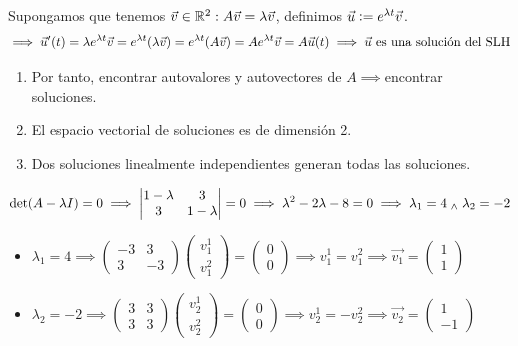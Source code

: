 Supongamos que tenemos $\vec{v} \in \mathbb{R}^2 : A\vec{v} = \lambda \vec{v}$, definimos $\vec{u} \vcentcolon= e^{\lambda t} \vec{v}$.
\[\implies \vec{u}'(t) = \lambda e^{\lambda t} \vec{v} = e^{\lambda t} (\lambda \vec{v}) = e^{\lambda t} (A \vec{v}) = A e^{\lambda t} \vec{v} = A \vec{u}(t) \implies \vec{u} \text{ es una solución del SLH}\]
\begin{enumerate}
	\item Por tanto, encontrar autovalores y autovectores de $A\implies $encontrar soluciones.
	\item El espacio vectorial de soluciones es de dimensión 2.
	\item Dos soluciones linealmente independientes generan todas las soluciones.
\end{enumerate}
\[\det(A-\lambda I ) = 0 \implies \begin{vmatrix} 1-\lambda & 3 \\ 3 & 1-\lambda \end{vmatrix} = 0 \implies \lambda^2 - 2\lambda - 8 = 0 \implies \lambda_1 = 4 \; _{\wedge} \; \lambda_2 = -2\]
\begin{itemize}
	\item $\lambda_1 = 4 \implies \begin{pmatrix} -3 & 3 \\ 3 & -3 \end{pmatrix} \begin{pmatrix} v_1^1 \\ v_1^2 \end{pmatrix} = \begin{pmatrix} 0 \\ 0 \end{pmatrix} \implies v_1^1 = v_1^2 \implies \vec{v_1} = \begin{pmatrix} 1 \\ 1 \end{pmatrix}$
	\item $\lambda_2 = -2 \implies \begin{pmatrix} 3 & 3 \\ 3 & 3 \end{pmatrix} \begin{pmatrix} v_2^1 \\ v_2^2 \end{pmatrix} = \begin{pmatrix} 0 \\ 0 \end{pmatrix} \implies v_2^1 = -v_2^2 \implies \vec{v_2} = \begin{pmatrix} 1 \\ -1 \end{pmatrix}$
\end{itemize}
